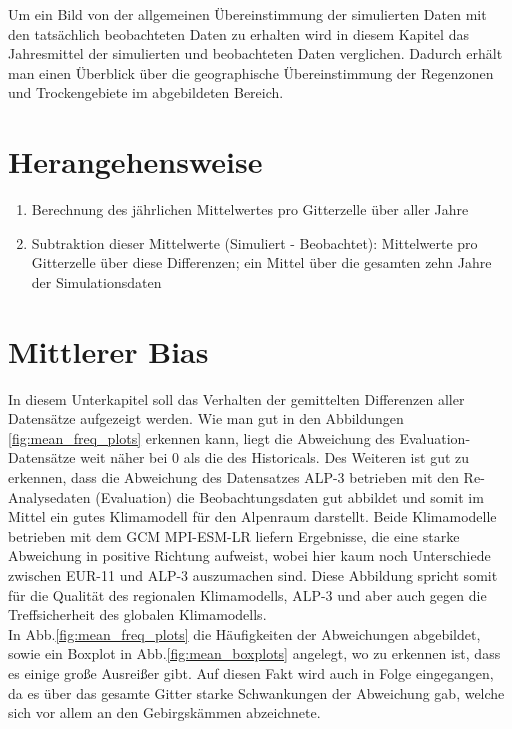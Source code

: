 Um ein Bild von der allgemeinen Übereinstimmung der simulierten Daten mit den tatsächlich beobachteten Daten zu erhalten wird in diesem Kapitel das Jahresmittel der simulierten und beobachteten Daten verglichen. Dadurch erhält man einen Überblick über die geographische Übereinstimmung der Regenzonen und Trockengebiete im abgebildeten Bereich.
\section{Herangehensweise}
\begin{enumerate}
	\item Berechnung des jährlichen Mittelwertes pro Gitterzelle über aller Jahre
	\item Subtraktion dieser Mittelwerte (Simuliert - Beobachtet): Mittelwerte pro Gitterzelle über diese Differenzen; ein Mittel über die gesamten zehn Jahre der Simulationsdaten	
\end{enumerate}
\section{Mittlerer Bias}
In diesem Unterkapitel soll das Verhalten der gemittelten Differenzen aller Datensätze aufgezeigt werden.
Wie man gut in den Abbildungen \ref{fig:mean_freq_plots} erkennen kann, liegt die Abweichung des Evaluation-Datensätze weit näher bei 0 als die des Historicals. Des Weiteren ist gut zu erkennen, dass die Abweichung des Datensatzes ALP-3 betrieben mit den Re-Analysedaten (Evaluation) die Beobachtungsdaten gut abbildet und somit im Mittel ein gutes Klimamodell für den Alpenraum darstellt. Beide Klimamodelle betrieben mit dem GCM MPI-ESM-LR liefern Ergebnisse, die eine starke Abweichung in positive Richtung aufweist, wobei hier kaum noch Unterschiede zwischen EUR-11 und ALP-3 auszumachen sind. Diese Abbildung spricht somit für die Qualität des regionalen Klimamodells, ALP-3 und aber auch gegen die Treffsicherheit des globalen Klimamodells.\\
In Abb.\ref{fig:mean_freq_plots} die Häufigkeiten der Abweichungen abgebildet, sowie ein Boxplot in Abb.\ref{fig:mean_boxplots} angelegt, wo zu erkennen ist, dass es einige große Ausreißer gibt. Auf diesen Fakt wird auch in Folge eingegangen, da es über das gesamte Gitter starke Schwankungen der Abweichung gab, welche sich vor allem an den Gebirgskämmen abzeichnete.\\

